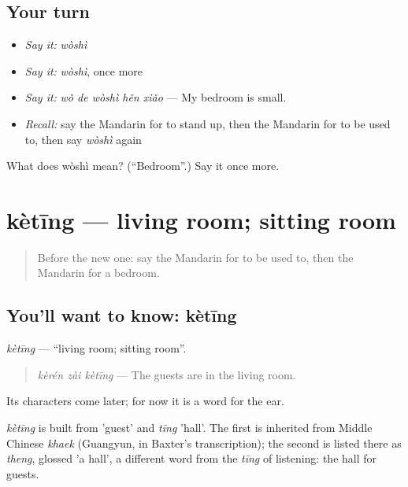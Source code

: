 \subsection*{Your turn}
\begin{itemize}
\raggedright
  \item \emph{Say it:} \emph{wòshì}
  \item \emph{Say it:} \emph{wòshì}, once more
  \item \emph{Say it:} \emph{wǒ de wòshì hěn xiǎo} — My bedroom is small.
  \item \emph{Recall:} say the Mandarin for to stand up, then the Mandarin for to be used to, then say \emph{wòshì} again
\end{itemize}

\begin{tcolorbox}[breakable,colback=teal!4,colframe=teal!35!black,title={Before you move on}]
What does wòshì mean? (\textquotedblleft{}Bedroom\textquotedblright{}.) Say it once more.
\end{tcolorbox}
\section[kètīng]{kètīng — living room; sitting room}

\label{lesson:ZH-C159-keting}



\begin{quote}
Before the new one: say the Mandarin for to be used to, then the Mandarin for a bedroom.
\end{quote}

\subsection*{You'll want to know: kètīng}
\emph{kètīng} — \textquotedblleft{}living room; sitting room\textquotedblright{}.

\begin{quote}
\emph{kèrén zài kètīng} — The guests are in the living room.
\end{quote}

Its characters come later; for now it is a word for the ear.

\begin{cousinweb}
\emph{kètīng} is built from  'guest' and \emph{tīng} 'hall'. The first is inherited from Middle Chinese \emph{khaek} (Guangyun, in Baxter's transcription); the second is listed there as \emph{theng}, glossed 'a hall', a different word from the \emph{tīng} of listening: the hall for guests.
\end{cousinweb}

